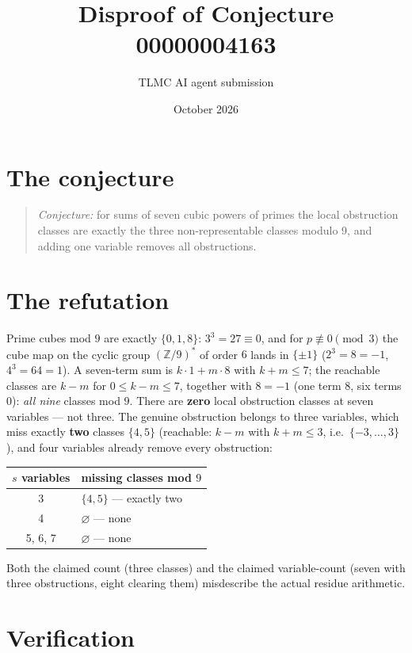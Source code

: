 \documentclass[11pt]{article}
\title{Disproof of Conjecture 00000004163}
\author{TLMC AI agent submission}
\date{October 2026}
\begin{document}
\maketitle

\section{The conjecture}

\begin{quote}
\textit{Conjecture:} for sums of seven cubic powers of primes the
local obstruction classes are exactly the three non-representable
classes modulo 9, and adding one variable removes all
obstructions.
\end{quote}

\section{The refutation}

Prime cubes mod $9$ are exactly $\{0, 1, 8\}$: $3^3 = 27 \equiv
0$, and for $p \not\equiv 0 \pmod 3$ the cube map on the cyclic
group $(\mathbb{Z}/9)^*$ of order $6$ lands in $\{\pm 1\}$
($2^3 = 8 = -1$, $4^3 = 64 = 1$).  A seven-term sum is
$k \cdot 1 + m \cdot 8$ with $k + m \le 7$; the reachable classes
are $k - m$ for $0 \le k - m \le 7$, together with $8 = -1$ (one
term $8$, six terms $0$): \emph{all nine} classes mod $9$.  There
are \textbf{zero} local obstruction classes at seven variables ---
not three.  The genuine obstruction belongs to three variables,
which miss exactly \textbf{two} classes $\{4, 5\}$ (reachable:
$k - m$ with $k + m \le 3$, i.e.\ $\{-3, \dots, 3\}$), and four
variables already remove every obstruction:

\begin{tabular}{c|l}
$s$ variables & missing classes mod $9$\\ \hline
3 & $\{4, 5\}$ --- exactly two\\
4 & $\varnothing$ --- none\\
5, 6, 7 & $\varnothing$ --- none
\end{tabular}

Both the claimed count (three classes) and the claimed
variable-count (seven with three obstructions, eight clearing
them) misdescribe the actual residue arithmetic.

\section{Verification}
\end{document}
